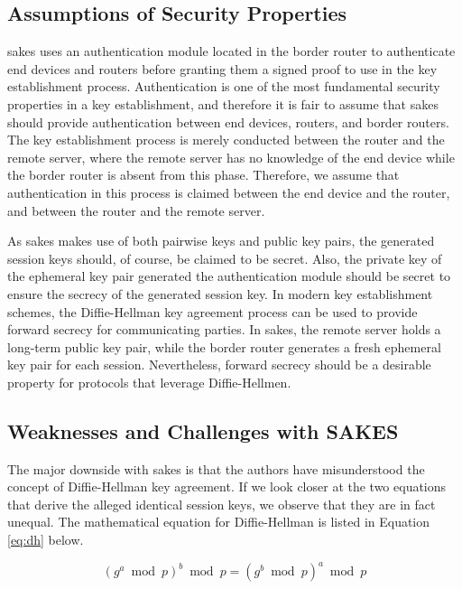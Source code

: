 \subsection{Assumptions of Security Properties}
\label{subsec:sakes-props}

\gls{sakes} uses an authentication module located in the border router to authenticate end devices and routers before granting them a signed proof to use in the key establishment process. Authentication is one of the most fundamental security properties in a key establishment, and therefore it is fair to assume that \gls{sakes} should provide authentication between end devices, routers, and border routers. The key establishment process is merely conducted between the router and the remote server, where the remote server has no knowledge of the end device while the border router is absent from this phase. Therefore, we assume that authentication in this process is claimed between the end device and the router, and between the router and the remote server.

As \gls{sakes} makes use of both pairwise keys and public key pairs, the generated session keys should, of course, be claimed to be secret. Also, the private key of the ephemeral key pair generated the authentication module should be secret to ensure the secrecy of the generated session key. In modern key establishment schemes, the Diffie-Hellman key agreement process can be used to provide forward secrecy for communicating parties. In \gls{sakes}, the remote server holds a long-term public key pair, while the border router generates a fresh ephemeral key pair for each session. Nevertheless, forward secrecy should be a desirable property for protocols that leverage Diffie-Hellmen. 


\subsection{Weaknesses and Challenges with SAKES}

The major downside with \gls{sakes} is that the authors have misunderstood the concept of Diffie-Hellman key agreement. If we look closer at the two equations that derive the alleged identical session keys, we observe that they are in fact unequal. The mathematical equation for Diffie-Hellman is listed in Equation \ref{eq:dh} below.

\begin{equation}
\label{eq:dh}
(g^a \bmod p)^b \bmod p = (g^b \bmod p)^a \bmod p
\end{equation}

